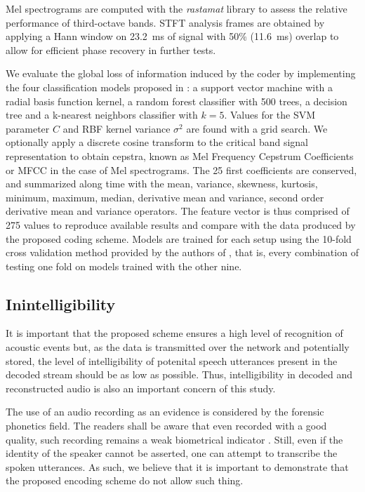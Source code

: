\documentclass[sensors,article,submit,moreauthors,pdftex,10pt,a4paper]{mdpi}
\begin{document}
Mel spectrograms are computed with the \textit{rastamat} library \cite{ellis2005} to assess the relative performance of third-octave bands. STFT analysis frames are obtained by applying a Hann window on 23.2~ms of signal with 50\% (11.6~ms) overlap to allow for efficient phase recovery in further tests.

We evaluate the global loss of information induced by the coder by implementing the four classification models proposed in \cite{salamon2014}: a support vector machine with a radial basis function kernel, a random forest classifier with 500 trees, a decision tree and a k-nearest neighbors classifier with $k = 5$. Values for the SVM parameter $C$ and RBF kernel variance $\sigma^2$ are found with a grid search. We optionally apply a discrete cosine transform to the critical band signal representation to obtain cepstra, known as Mel Frequency Cepstrum Coefficients or MFCC in the case of Mel spectrograms. The 25 first coefficients are conserved, and summarized along time with the mean, variance, skewness, kurtosis, minimum, maximum, median, derivative mean and variance, second order derivative mean and variance operators. The feature vector is thus comprised of 275 values to reproduce available results and compare with the data produced by the proposed coding scheme. Models are trained for each setup using the 10-fold cross validation method provided by the authors of \cite{salamon2014}, that is, every combination of testing one fold on models trained with the other nine.

\subsection{Inintelligibility} \label{sec:inintelligibility}

It is important that the proposed scheme ensures a high level of recognition of acoustic events but, as the data is transmitted over the network and potentially stored, the level of intelligibility of potenital speech utterances present in the decoded stream should be as low as possible. Thus, intelligibility in decoded and reconstructed audio is also an important concern of this study.

The use of an audio recording as an evidence is considered by the forensic phonetics \cite{baldwin1990forensic} field. The readers shall be aware that even recorded with a good quality, such recording remains a weak biometrical indicator \cite{boe2000forensic}. Still, even if the identity of the speaker cannot be asserted, one can attempt to transcribe the spoken utterances. As such, we believe that it is important to demonstrate that the proposed encoding scheme do not allow such thing.
\end{document}

